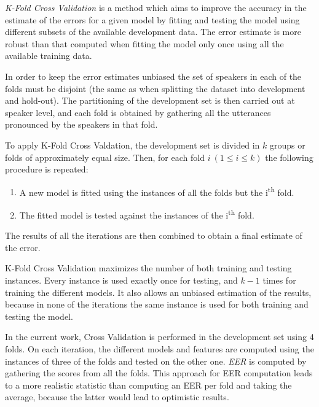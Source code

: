 \textit{K-Fold Cross Validation} \cite{svm_jwht}
is a method which aims to improve the accuracy in the
estimate of the errors for a given model by fitting and testing the model using different
subsets of the available development data. The error estimate is more robust than
that computed when fitting the model only once using all the available training data.

In order to keep the error estimates unbiased
the set of speakers in each of the folds must be disjoint (the same as
when splitting the dataset into development and hold-out).
The partitioning of the development set
is then carried out at speaker level, and each fold is obtained by gathering all the
utterances pronounced by the speakers in that fold.

To apply K-Fold Cross Valdation,
the development set is divided in $k$ groups or folds of approximately equal size.
Then, for each fold $i \ (1 \leq i \leq k)$ the following procedure is repeated:

\begin{enumerate}
  \item A new model is fitted using the instances of all the folds but the i\textsuperscript{th} fold.
  \item The fitted model is tested against the instances of the i\textsuperscript{th} fold.
\end{enumerate}

The results of all the iterations are then combined to obtain a final estimate of the error.

K-Fold Cross Validation maximizes the number of both training and testing instances.
Every instance is used exactly once for testing, and $k-1$ times for training the different
models. It also allows an unbiased estimation of the results,
because in none of the iterations the same instance is used for both training and testing the
model.

In the current work, Cross Validation is performed in the development set using 4 folds.
On each iteration, the different models and features are computed using the instances of
three of the folds and tested on the other one.
\textit{EER} is computed by gathering the scores from all the folds.
This approach for EER computation leads to a more realistic statistic than computing an EER
per fold and taking the average, because the latter would lead to optimistic results.
